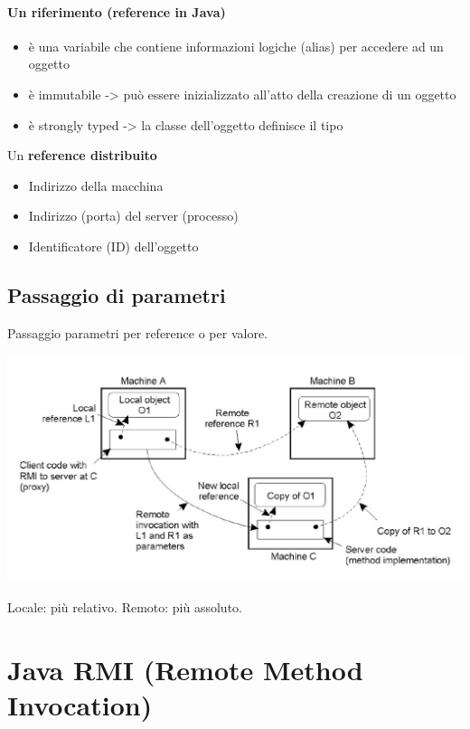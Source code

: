 \subsubsection{Un riferimento (reference in Java)}
\begin{itemize}
    \item è una variabile che contiene informazioni logiche (alias) per accedere ad un oggetto
    \item è immutabile -> può essere inizializzato all'atto della creazione di un oggetto
    \item è strongly typed -> la classe dell'oggetto definisce il tipo
\end{itemize}
Un \textbf{reference distribuito}
\begin{itemize}
    \item Indirizzo della macchina
    \item Indirizzo (porta) del server (processo)
    \item Identificatore (ID) dell'oggetto
\end{itemize}

\section{Passaggio di parametri}
Passaggio parametri per reference o per valore.
\begin{center}
    \includegraphics[scale=0.5]{img/DO_passaggioparametri1.jpg}
\end{center}
Locale: più relativo. Remoto: più assoluto.

\chapter{Java RMI (Remote Method Invocation)}
